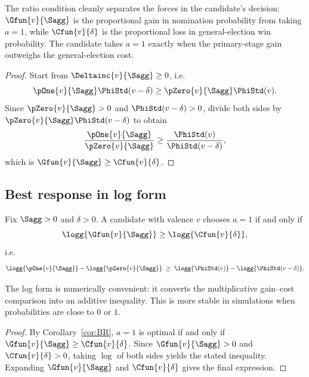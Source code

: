 The ratio condition cleanly separates the forces in the candidate's decision:
$\Gfun{v}{\Sagg}$ is the proportional gain in nomination probability from taking $a=1$,
while $\Cfun{v}{\delta}$ is the proportional loss in general-election win probability.
The candidate takes $a=1$ exactly when the primary-stage gain outweighs the general-election cost.


\begin{proof}
Start from $\Deltainc{v}{\Sagg} \ge 0$, i.e.
\[
    \pOne{v}{\Sagg}\PhiStd(v-\delta) \ge \pZero{v}{\Sagg}\PhiStd(v).
\]
Since $\pZero{v}{\Sagg}>0$ and $\PhiStd(v-\delta)>0$, divide both sides by
$\pZero{v}{\Sagg}\PhiStd(v-\delta)$ to obtain
\[
    \frac{\pOne{v}{\Sagg}}{\pZero{v}{\Sagg}} \ge \frac{\PhiStd(v)}{\PhiStd(v-\delta)},
\]
which is $\Gfun{v}{\Sagg} \ge \Cfun{v}{\delta}$.
\end{proof}

\subsection{Best response in log form}

\begin{corollary}\label{cor:BRlog}
Fix $\Sagg > 0$ and $\delta >0$. A candidate with valence $v$ chooses $a = 1$ if and only if
\[
    \logg{\Gfun{v}{\Sagg}} \ge \logg{\Cfun{v}{\delta}},
\]
i.e.
\[
    \logg{\pOne{v}{\Sagg}} - \logg{\pZero{v}{\Sagg}}
    \;\ge\;
    \logg{\PhiStd(v)} - \logg{\PhiStd(v-\delta)}.
\]
\end{corollary}


The log form is numerically convenient: it converts the multiplicative gain--cost comparison
into an additive inequality. This is more stable in simulations when probabilities are close
to $0$ or $1$.


\begin{proof}
By Corollary~\ref{cor:BR}, $a=1$ is optimal if and only if $\Gfun{v}{\Sagg} \ge \Cfun{v}{\delta}$.
Since $\Gfun{v}{\Sagg}>0$ and $\Cfun{v}{\delta}>0$, taking $\log$ of both sides yields the stated
inequality. Expanding $\Gfun{v}{\Sagg}$ and $\Cfun{v}{\delta}$ gives the final expression.
\end{proof}